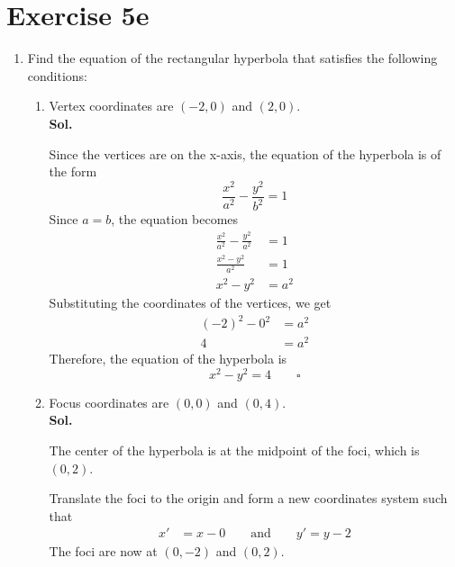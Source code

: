 \documentclass{report}
\newcommand{\sol}{\vspace{1em}\\\textbf{Sol.}}
\newcommand{\eos}{ \qquad \square}
\begin{document}
\section*{Exercise 5e}

\onehalfspacing
\begin{enumerate}[leftmargin=*]
    \item Find the equation of the rectangular hyperbola that satisfies the following
          conditions:
          \begin{enumerate}[label=(\alph*)]
              \item Vertex coordinates are $(-2,0)$ and $(2,0)$. \sol{}

                    Since the vertices are on the x-axis, the equation of the hyperbola is of the
                    form
                    \begin{equation*}
                        \frac{x^2}{a^2} - \frac{y^2}{b^2} = 1
                    \end{equation*}
                    Since $a = b$, the equation becomes
                    \begin{align*}
                        \frac{x^2}{a^2} - \frac{y^2}{a^2} & = 1   \\
                        \frac{x^2 - y^2}{a^2}             & = 1   \\
                        x^2 - y^2                         & = a^2
                    \end{align*}
                    Substituting the coordinates of the vertices, we get
                    \begin{align*}
                        (-2)^2 - 0^2 & = a^2 \\
                        4            & = a^2
                    \end{align*}
                    Therefore, the equation of the hyperbola is
                    \begin{equation*}
                        x^2 - y^2 = 4 \eos
                    \end{equation*}

              \item Focus coordinates are $(0,0)$ and $(0,4)$. \sol{}

                    The center of the hyperbola is at the midpoint of the foci, which is $(0,2)$.

                    Translate the foci to the origin and form a new coordinates system such that
                    \begin{align*}
                        x' & = x - 0 \qquad \text{and} \qquad y' = y - 2
                    \end{align*}
                    The foci are now at $(0,-2)$ and $(0,2)$.


\end{enumerate}
\end{enumerate}
\end{document}
